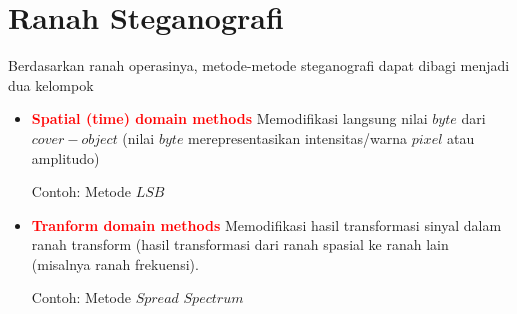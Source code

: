 \documentclass{article}
\begin{document}

\section*{Ranah Steganografi}

Berdasarkan ranah operasinya, metode-metode steganografi dapat dibagi menjadi dua kelompok

\begin{itemize}
    \item \textbf{\textcolor{red}{Spatial (time) domain methods}}
    Memodifikasi langsung nilai $byte$ dari $cover-object$ (nilai $byte$ merepresentasikan intensitas/warna $pixel$ atau amplitudo)
    \par Contoh: Metode $LSB$
    
    \item \textbf{\textcolor{red}{Tranform domain methods}}
    Memodifikasi hasil transformasi sinyal dalam ranah transform (hasil transformasi dari ranah spasial ke ranah lain (misalnya ranah frekuensi).
    \par Contoh: Metode $Spread$ $Spectrum$
\end{itemize}
\end{document}
